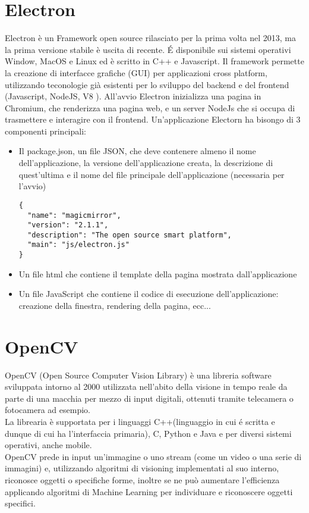 \section{Electron}
Electron è un Framework open source rilasciato per la prima volta nel 2013, ma la prima versione
stabile è uscita di recente. \'E disponibile sui sistemi operativi Window, MacOS e Linux ed è scritto
in C++ e Javascript. Il framework permette la creazione di interfacce grafiche (GUI) per
applicazioni cross platform, utilizzando teconologie già esistenti per lo sviluppo del backend e del frontend
(Javascript, NodeJS, V8 \cite{V8}).
All'avvio Electron inizializza una pagina in Chromium, che renderizza una pagina web, e un server
NodeJs che si occupa di trasmettere e interagire con il frontend.
Un'applicazione Electorn ha bisongo di 3 componenti principali:
\begin{itemize}
\item Il package.json, un file JSON, che deve contenere almeno il nome dell'applicazione,
la versione dell'applicazione creata, la descrizione di quest'ultima e il
 nome del file principale dell'applicazione (necessaria per l'avvio)
\begin{lstlisting}
{
  "name": "magicmirror",
  "version": "2.1.1",
  "description": "The open source smart platform",
  "main": "js/electron.js"
}
\end{lstlisting}
\item Un file html che contiene il template della pagina mostrata dall'applicazione
\item Un file JavaScript che contiene il codice di esecuzione dell'applicazione: creazione della finestra,
rendering della pagina, ecc...
\end{itemize}

\section{OpenCV}
OpenCV (Open Source Computer Vision Library) è una libreria software sviluppata intorno al 2000
utilizzata nell'abito della visione in tempo reale
da parte di una macchia per mezzo di input digitali, ottenuti tramite telecamera o fotocamera ad esempio.\\
La librearia è supportata per i linguaggi C++(linguaggio in cui \'e scritta e dunque di cui ha l'interfaccia primaria), C, Python e Java e
per diversi sistemi operativi, anche mobile.\\
OpenCV prede in input un'immagine o uno stream (come un video o una serie di immagini) e, utilizzando algoritmi
di visioning implementati al suo interno, riconosce oggetti o specifiche forme, inoltre se ne può aumentare l'efficienza
applicando algoritmi di Machine Learning per individuare e riconoscere oggetti specifici.

